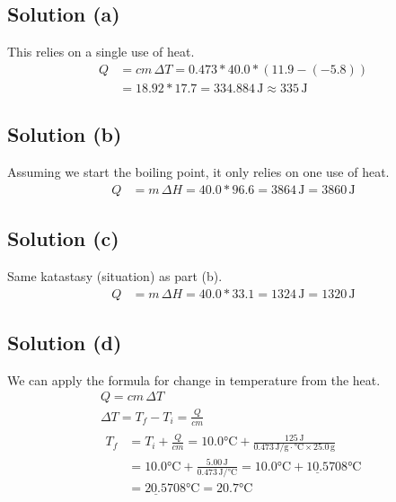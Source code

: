 \documentclass[10pt]{article}
\newcommand{\U}[1]{\underline{#1}}
\begin{document}
        \subsection{Solution (a)}
            This relies on a single use of heat.
            \begin{align}
                Q   &=  cm\,\Delta T
                    =   0.473 * 40.0 * (11.9 - (-5.8))\\
                    &=  18.92 * 17.7
                    =   334.884\,\unit{\joule}
                    \approx \boxed{335\,\unit{\joule}}
            \end{align}

        \subsection{Solution (b)}
            Assuming we start the boiling point, it only relies on one use of heat.
            \begin{align}
                Q   &=  m\,\Delta H
                    =   40.0 * 96.6
                    =   3864\,\unit{\joule}
                    =   \boxed{3860\,\unit{\joule}}
            \end{align}

        \subsection{Solution (c)}
            Same katastasy (situation) as part (b).
            \begin{align}
                Q   &=  m\,\Delta H
                    =   40.0 * 33.1
                    =   1324\,\unit{\joule}
                    =   \boxed{1320\,\unit{\joule}}
            \end{align}

        \subsection{Solution (d)}
            We can apply the formula for change in temperature from the heat.
            \begin{gather}
                Q   =   cm\,\Delta T\\
                \Delta T    =   T_f - T_i
                    =   \frac{Q}{cm}\\
                \begin{align}
                    T_f &=  T_i + \frac{Q}{cm}
                        =   10.0\unit{\celsius} + \frac{125\,\unit{\joule}}{0.473\,\unit{\joule/\gram\cdot\celsius} \times 25.0\,\unit{\gram}}\\
                        &=  10.0\unit{\celsius} + \frac{5.00\,\unit{\joule}}{0.473\,\unit{\joule/\celsius}}
                        =   10.0\unit{\celsius} + \underline{10.5}708\unit{\celsius}\\
                        &=  \U{20.5}708\unit{\celsius}
                        =   \boxed{20.7\unit{\celsius}}
                \end{align}
            \end{gather}
\end{document}
